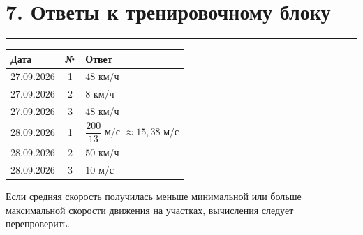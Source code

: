 \documentclass[a4paper,12pt]{article}
\newcommand{\sectionline}{%
  \vspace{0.15em}%
  \noindent\textcolor{accent}{\rule{\linewidth}{0.6pt}}%
  \vspace{0.3em}%
}
\begin{document}

\clearpage

\section*{7. Ответы к тренировочному блоку}
\sectionline

\renewcommand{\arraystretch}{1.35}

\begin{table}[h]
\centering
\begin{tabularx}{\linewidth}{@{}l c X@{}}
\toprule
\textbf{Дата} & \textbf{№} & \textbf{Ответ} \\
\midrule
27.09.2026 & 1 & $48$ км/ч \\
27.09.2026 & 2 & $8$ км/ч \\
27.09.2026 & 3 & $48$ км/ч \\
\midrule
28.09.2026 & 1 & $\dfrac{200}{13}$ м/с $\approx15{,}38$ м/с \\
28.09.2026 & 2 & $50$ км/ч \\
28.09.2026 & 3 & $10$ м/с \\
\bottomrule
\end{tabularx}
\end{table}

\vfill

\begin{center}
\small\color{softgray}
Если средняя скорость получилась меньше минимальной или больше максимальной скорости движения на участках, вычисления следует перепроверить.
\end{center}
\end{document}
